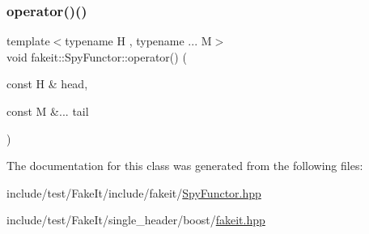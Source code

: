 \mbox{\label{classfakeit_1_1SpyFunctor_aaac87a66aafadbf0ef8859114546ff9f}} 
\subsubsection{\texorpdfstring{operator()()}{operator()()}\hspace{0.1cm}{\footnotesize\ttfamily [9/9]}}
{\footnotesize\ttfamily template$<$typename H , typename ... M$>$ \\
void fakeit\+::\+Spy\+Functor\+::operator() (\begin{DoxyParamCaption}\item[{const H \&}]{head,  }\item[{const M \&...}]{tail }\end{DoxyParamCaption})\hspace{0.3cm}{\ttfamily [inline]}}



The documentation for this class was generated from the following files\+:\begin{DoxyCompactItemize}
\item 
include/test/\+Fake\+It/include/fakeit/\mbox{\hyperlink{SpyFunctor_8hpp}{Spy\+Functor.\+hpp}}\item 
include/test/\+Fake\+It/single\+\_\+header/boost/\mbox{\hyperlink{single__header_2boost_2fakeit_8hpp}{fakeit.\+hpp}}\end{DoxyCompactItemize}
